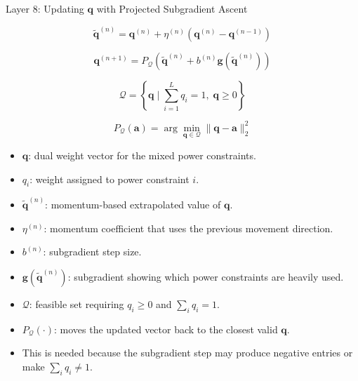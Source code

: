 \documentclass{beamer}
\begin{document}
\begin{frame}{Layer 8: Updating \(\mathbf{q}\) with Projected Subgradient Ascent}
\scriptsize

\[
\widetilde{\mathbf{q}}^{(n)}
=
\mathbf{q}^{(n)}
+
\eta^{(n)}
\left(
\mathbf{q}^{(n)}-\mathbf{q}^{(n-1)}
\right)
\]

\[
\mathbf{q}^{(n+1)}
=
P_{\mathcal{Q}}
\left(
\widetilde{\mathbf{q}}^{(n)}
+
b^{(n)}
\mathbf{g}(\widetilde{\mathbf{q}}^{(n)})
\right)
\]

\[
\mathcal{Q}
=
\left\{
\mathbf{q}\mid
\sum_{i=1}^{L}q_i=1,\;
\mathbf{q}\ge0
\right\}
\]

\[
P_{\mathcal{Q}}(\mathbf{a})
=
\arg\min_{\mathbf{q}\in\mathcal{Q}}
\|\mathbf{q}-\mathbf{a}\|_2^2
\]

\begin{itemize}
    \item \(\mathbf{q}\): dual weight vector for the mixed power constraints.
    \item \(q_i\): weight assigned to power constraint \(i\).
    \item \(\widetilde{\mathbf{q}}^{(n)}\): momentum-based extrapolated value of \(\mathbf{q}\).
    \item \(\eta^{(n)}\): momentum coefficient that uses the previous movement direction.
    \item \(b^{(n)}\): subgradient step size.
    \item \(\mathbf{g}(\widetilde{\mathbf{q}}^{(n)})\): subgradient showing which power constraints are heavily used.
    \item \(\mathcal{Q}\): feasible set requiring \(q_i\ge0\) and \(\sum_i q_i=1\).
    \item \(P_{\mathcal{Q}}(\cdot)\): moves the updated vector back to the closest valid \(\mathbf{q}\).
    \item This is needed because the subgradient step may produce negative entries or make \(\sum_iq_i\ne1\).
\end{itemize}

\end{frame}
\end{document}
